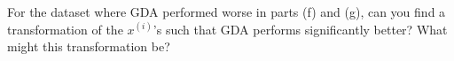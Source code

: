 \item {} For the dataset where GDA performed worse in
parts (f) and (g), can you find a transformation of the $x^{(i)}$'s such
that GDA performs significantly better? What might this transformation be?

